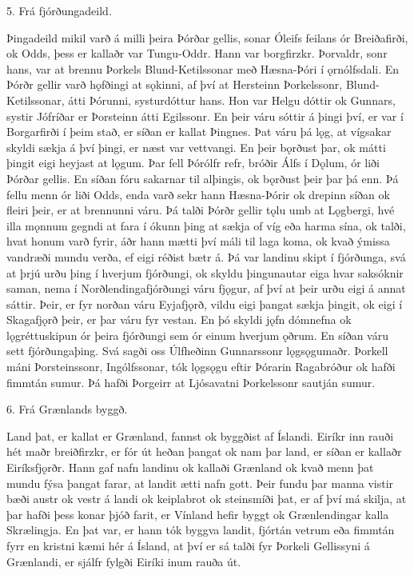5. Frá fjórðungadeild.

Þingadeild mikil varð á milli þeira Þórðar gellis, sonar Óleifs feilans ór Breiðafirði, ok Odds, þess er kallaðr var Tungu-Oddr. Hann var borgfirzkr. Þorvaldr, sonr hans, var at brennu Þorkels Blund-Ketilssonar með Hæsna-Þóri í ǫrnólfsdali. En Þórðr gellir varð hǫfðingi at sǫkinni, af því at Hersteinn Þorkelssonr, Blund-Ketilssonar, átti Þórunni, systurdóttur hans. Hon var Helgu dóttir ok Gunnars, systir Jófríðar er Þorsteinn átti Egilssonr.
En þeir váru sóttir á þingi því, er var í Borgarfirði í þeim stað, er síðan er kallat Þingnes. Þat váru þá lǫg, at vígsakar skyldi sækja á því þingi, er næst var vettvangi. En þeir bǫrðust þar, ok mátti þingit eigi heyjast at lǫgum. Þar fell Þórólfr refr, bróðir Álfs í Dǫlum, ór liði Þórðar gellis.
En síðan fóru sakarnar til alþingis, ok bǫrðust þeir þar þá enn. Þá fellu menn ór liði Odds, enda varð sekr hann Hæsna-Þórir ok drepinn síðan ok fleiri þeir, er at brennunni váru.
Þá talði Þórðr gellir tǫlu umb at Lǫgbergi, hvé illa mǫnnum gegndi at fara í ókunn þing at sækja of víg eða harma sína, ok talði, hvat honum varð fyrir, áðr hann mætti því máli til laga koma, ok kvað ýmissa vandræði mundu verða, ef eigi réðist bætr á.
Þá var landinu skipt í fjórðunga, svá at þrjú urðu þing í hverjum fjórðungi, ok skyldu þingunautar eiga hvar saksóknir saman, nema í Norðlendingafjórðungi váru fjǫgur, af því at þeir urðu eigi á annat sáttir. Þeir, er fyr norðan váru Eyjafjǫrð, vildu eigi þangat sækja þingit, ok eigi í Skagafjǫrð þeir, er þar váru fyr vestan. En þó skyldi jǫfn dómnefna ok lǫgréttuskipun ór þeira fjórðungi sem ór einum hverjum ǫðrum. En síðan váru sett fjórðungaþing. Svá sagði oss Úlfheðinn Gunnarssonr lǫgsǫgumaðr.
Þorkell máni Þorsteinssonr, Ingólfssonar, tók lǫgsǫgu eftir Þórarin Ragabróður ok hafði fimmtán sumur. Þá hafði Þorgeirr at Ljósavatni Þorkelssonr sautján sumur.


6. Frá Grænlands byggð.

Land þat, er kallat er Grænland, fannst ok byggðist af Íslandi.
Eiríkr inn rauði hét maðr breiðfirzkr, er fór út heðan þangat ok nam þar land, er síðan er kallaðr Eiríksfjǫrðr. Hann gaf nafn landinu ok kallaði Grænland ok kvað menn þat mundu fýsa þangat farar, at landit ætti nafn gott. Þeir fundu þar manna vistir bæði austr ok vestr á landi ok keiplabrot ok steinsmíði þat, er af því má skilja, at þar hafði þess konar þjóð farit, er Vínland hefir byggt ok Grænlendingar kalla Skrælingja. En þat var, er hann tók byggva landit, fjórtán vetrum eða fimmtán fyrr en kristni kæmi hér á Ísland, at því er sá talði fyr Þorkeli Gellissyni á Grænlandi, er sjálfr fylgði Eiríki inum rauða út.


